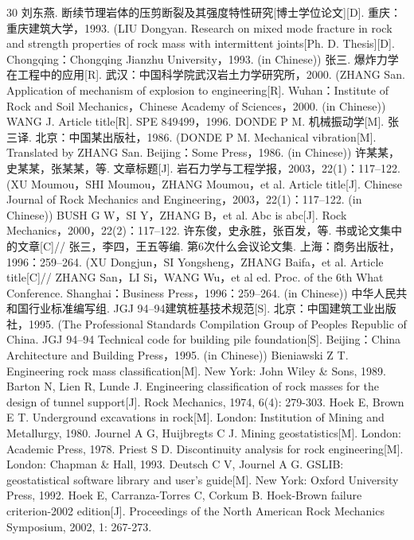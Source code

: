 \documentclass[twocolumn,a4paper,10pt]{article}
\begin{document}

\begin{thebibliography}{30}
 刘东燕. 断续节理岩体的压剪断裂及其强度特性研究[博士学位论文][D]. 重庆：重庆建筑大学，1993. (LIU Dongyan. Research on mixed mode fracture in rock and strength properties of rock mass with intermittent joints[Ph. D. Thesis][D]. Chongqing：Chongqing Jianzhu University，1993. (in Chinese))
 张三. 爆炸力学在工程中的应用[R]. 武汉：中国科学院武汉岩土力学研究所，2000. (ZHANG San. Application of mechanism of explosion to engineering[R]. Wuhan：Institute of Rock and Soil Mechanics，Chinese Academy of Sciences，2000. (in Chinese))
 WANG J. Article title[R]. SPE 849499，1996.
 DONDE P M. 机械振动学[M]. 张三译. 北京：中国某出版社，1986. (DONDE P M. Mechanical vibration[M]. Translated by ZHANG San. Beijing：Some Press，1986. (in Chinese))
 许某某，史某某，张某某，等. 文章标题[J]. 岩石力学与工程学报，2003，22(1)：117–122. (XU Moumou，SHI Moumou，ZHANG Moumou，et al. Article title[J]. Chinese Journal of Rock Mechanics and Engineering，2003，22(1)：117–122. (in Chinese))
 BUSH G W，SI Y，ZHANG B，et al. Abc is abc[J]. Rock Mechanics，2000，22(2)：117–122.
 许东俊，史永胜，张百发，等. 书或论文集中的文章[C]// 张三，李四，王五等编. 第6次什么会议论文集. 上海：商务出版社，1996：259–264. (XU Dongjun，SI Yongsheng，ZHANG Baifa，et al. Article title[C]// ZHANG San，LI Si，WANG Wu，et al ed. Proc. of the 6th What Conference. Shanghai：Business Press，1996：259–264. (in Chinese))
 中华人民共和国行业标准编写组. JGJ 94–94建筑桩基技术规范[S]. 北京：中国建筑工业出版社，1995. (The Professional Standards Compilation Group of Peoples Republic of China. JGJ 94–94 Technical code for building pile foundation[S]. Beijing：China Architecture and Building Press，1995. (in Chinese))
 Bieniawski Z T. Engineering rock mass classification[M]. New York: John Wiley \& Sons, 1989.
 Barton N, Lien R, Lunde J. Engineering classification of rock masses for the design of tunnel support[J]. Rock Mechanics, 1974, 6(4): 279-303.
 Hoek E, Brown E T. Underground excavations in rock[M]. London: Institution of Mining and Metallurgy, 1980.
 Journel A G, Huijbregts C J. Mining geostatistics[M]. London: Academic Press, 1978.
 Priest S D. Discontinuity analysis for rock engineering[M]. London: Chapman \& Hall, 1993.
 Deutsch C V, Journel A G. GSLIB: geostatistical software library and user's guide[M]. New York: Oxford University Press, 1992.
 Hoek E, Carranza-Torres C, Corkum B. Hoek-Brown failure criterion-2002 edition[J]. Proceedings of the North American Rock Mechanics Symposium, 2002, 1: 267-273.

\end{thebibliography}
\end{document}
